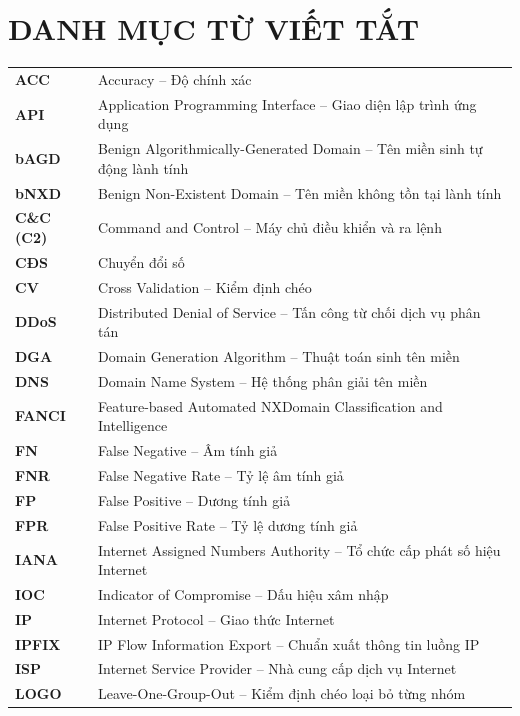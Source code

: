 \section*{DANH MỤC TỪ VIẾT TẮT}

\begin{longtable}{p{2.6cm} p{12.4cm}}
\textbf{ACC} & Accuracy -- Độ chính xác \\
\textbf{API} & Application Programming Interface -- Giao diện lập trình ứng dụng \\
\textbf{bAGD} & Benign Algorithmically-Generated Domain -- Tên miền sinh tự động lành tính \\
\textbf{bNXD} & Benign Non-Existent Domain -- Tên miền không tồn tại lành tính \\
\textbf{C\&C (C2)} & Command and Control -- Máy chủ điều khiển và ra lệnh \\
\textbf{CĐS} & Chuyển đổi số \\
\textbf{CV} & Cross Validation -- Kiểm định chéo \\
\textbf{DDoS} & Distributed Denial of Service -- Tấn công từ chối dịch vụ phân tán \\
\textbf{DGA} & Domain Generation Algorithm -- Thuật toán sinh tên miền \\
\textbf{DNS} & Domain Name System -- Hệ thống phân giải tên miền \\
\textbf{FANCI} & Feature-based Automated NXDomain Classification and Intelligence \\
\textbf{FN} & False Negative -- Âm tính giả \\
\textbf{FNR} & False Negative Rate -- Tỷ lệ âm tính giả \\
\textbf{FP} & False Positive -- Dương tính giả \\
\textbf{FPR} & False Positive Rate -- Tỷ lệ dương tính giả \\
\textbf{IANA} & Internet Assigned Numbers Authority -- Tổ chức cấp phát số hiệu Internet \\
\textbf{IOC} & Indicator of Compromise -- Dấu hiệu xâm nhập \\
\textbf{IP} & Internet Protocol -- Giao thức Internet \\
\textbf{IPFIX} & IP Flow Information Export -- Chuẩn xuất thông tin luồng IP \\
\textbf{ISP} & Internet Service Provider -- Nhà cung cấp dịch vụ Internet \\
\textbf{LOGO} & Leave-One-Group-Out -- Kiểm định chéo loại bỏ từng nhóm \\

\end{longtable}

